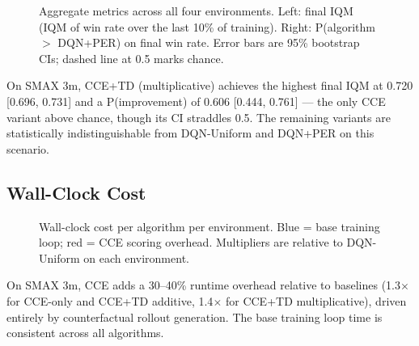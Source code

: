 \documentclass[conference]{IEEEtran}
\begin{document}
\begin{figure}[h]
\centering
\caption{Aggregate metrics across all four environments. Left: final IQM (IQM of win rate over the last 10\% of training). Right: P(algorithm $>$ DQN+PER) on final win rate. Error bars are 95\% bootstrap CIs; dashed line at 0.5 marks chance.}
\label{fig:agg_metrics}
\end{figure}

On SMAX 3m, CCE+TD (multiplicative) achieves the highest final IQM at 0.720 [0.696, 0.731] and a P(improvement) of 0.606 [0.444, 0.761] --- the only CCE variant above chance, though its CI straddles 0.5.
The remaining variants are statistically indistinguishable from DQN-Uniform and DQN+PER on this scenario.

\subsection{Wall-Clock Cost}

\begin{figure}[h]
\centering
\caption{Wall-clock cost per algorithm per environment. Blue = base training loop; red = CCE scoring overhead. Multipliers are relative to DQN-Uniform on each environment.}
\label{fig:wallclock}
\end{figure}

On SMAX 3m, CCE adds a 30--40\% runtime overhead relative to baselines (1.3$\times$ for CCE-only and CCE+TD additive, 1.4$\times$ for CCE+TD multiplicative), driven entirely by counterfactual rollout generation.
The base training loop time is consistent across all algorithms.
\end{document}
